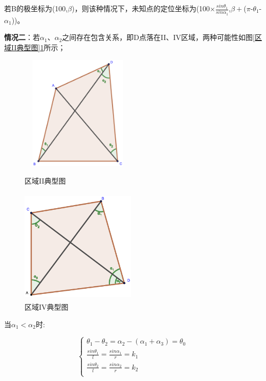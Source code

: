 \documentclass{ctexart}
\begin{document}
若B的极坐标为(100,$\beta$)，则该种情况下，未知点的定位坐标为(100$\times\frac{sin\theta_1}{sin\alpha_1}$,$\beta +$($\pi$-$\theta_1$-$\alpha_1$))。


\textbf{情况二}：若$\alpha_1$、$\alpha_2$之间存在包含关系，即D点落在II、IV区域，两种可能性如图\ref{区域II典型图}\ref{区域IV典型图}所示；

\begin{figure}[H]
  \begin{minipage}[t]{0.45\linewidth}
  \centering
  \includegraphics[height=5.5cm,width=5.5cm]{pic/case4.eps}
  \caption{区域II典型图}
  \label{区域II典型图}
  \end{minipage}%
  \begin{minipage}[t]{0.45\linewidth}
  \centering
  \includegraphics[height=5.5cm,width=5.5cm]{pic/case2+.eps}
  \caption{区域IV典型图}
  \label{区域IV典型图}
  \end{minipage}
  \end{figure}


当$\alpha_1 < \alpha_2$时:

\begin{equation}
    \left\{
              \begin{array}{ll}
                \theta_1-\theta_2=\alpha_2-(\alpha_1+\alpha_3)=\theta_0\\
                \frac{sin\theta_1}{l}=\frac{sin\alpha_1}{r}=k_1\\
                \frac{sin\theta_2}{l}=\frac{sin\alpha_2}{r}=k_2\\

              \end{array}
            \right.
\end{equation}
\end{document}
